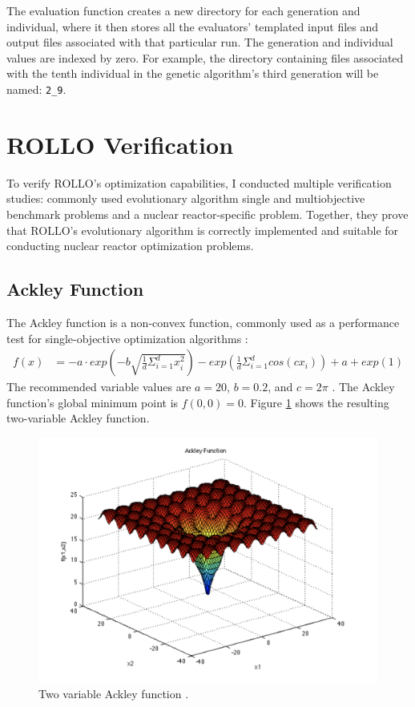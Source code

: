 The evaluation function creates a new directory for each generation and individual, 
where it then stores all the evaluators' templated input files and output files 
associated with that particular run. 
The generation and individual values are indexed by zero. 
For example, the directory containing files associated with the tenth individual in 
the genetic algorithm's third generation will be named: 
\texttt{2\_9}.


\section{ROLLO Verification}
To verify \gls{ROLLO}'s optimization capabilities, I conducted multiple verification 
studies: commonly used evolutionary algorithm single and multiobjective benchmark problems
and a nuclear reactor-specific problem. 
Together, they prove that \gls{ROLLO}'s evolutionary algorithm is correctly implemented 
and suitable for conducting nuclear reactor optimization problems. 

\subsection{Ackley Function}
The Ackley function is a non-convex function, commonly used as a performance test 
for single-objective optimization algorithms \cite{ackley_connectionist_2012}: 
\begin{align}
    f(x) &= -a \cdot exp \left(-b\sqrt{\frac{1}{d}\Sigma_{i=1}^dx_i^2}\right) - 
    exp \left(\frac{1}{d}\Sigma_{i=1}^d cos(cx_i)\right) + a + exp(1) 
\end{align}
The recommended variable values are $a=20$, $b=0.2$, and $c=2\pi$
\cite{sfu_ackley_nodate}. 
The Ackley function's global minimum point is $f(0,0) = 0$. 
Figure \ref{fig:ackley} shows the resulting two-variable Ackley function.
\begin{figure}[H]
    \centering
    \includegraphics[width=0.65\linewidth]{figures/ackley.png} 
    \caption{Two variable Ackley function \cite{sfu_ackley_nodate}.}
    \label{fig:ackley}
\end{figure}

